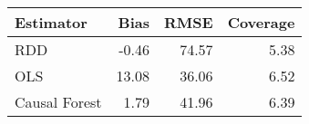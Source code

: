 \begin{table}[ht]
\centering
\begin{tabular}{lrrr}
  \hline
Estimator & Bias & RMSE & Coverage \\ 
  \hline
RDD & -0.46 & 74.57 & 5.38 \\ 
  OLS & 13.08 & 36.06 & 6.52 \\ 
  Causal Forest & 1.79 & 41.96 & 6.39 \\ 
   \hline
\end{tabular}
\end{table}
